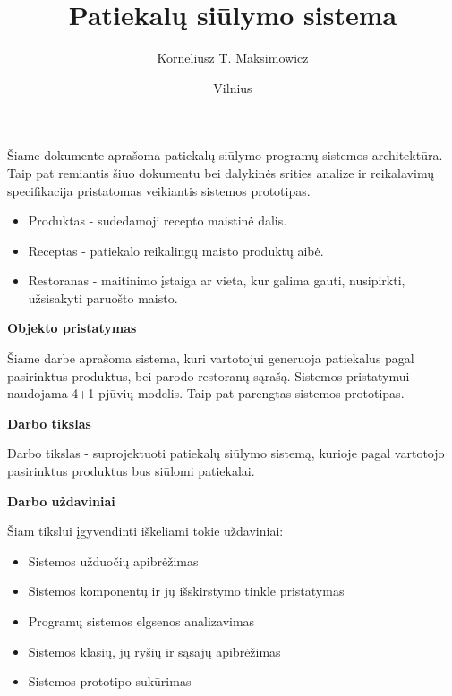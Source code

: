\documentclass{VUMIFInfKursinis}
\title{Patiekalų siūlymo sistema }
\author{Korneliusz T. Maksimowicz}
\date{Vilnius \\ \the\year}
\begin{document}
\maketitle


Šiame dokumente aprašoma patiekalų siūlymo programų sistemos architektūra.
Taip pat remiantis šiuo dokumentu bei dalykinės srities analize ir reikalavimų specifikacija
pristatomas veikiantis sistemos prototipas.

\begin{small}
\begin{itemize}[noitemsep,topsep=0pt]
\setlength\itemsep{0em}
\item {Produktas  - sudedamoji recepto maistinė dalis.}
\item {Receptas   - patiekalo reikalingų maisto produktų aibė.}
\item{Restoranas - maitinimo įstaiga ar vieta, kur galima gauti, nusipirkti, užsisakyti paruošto maisto.}
\end{itemize}

\end{small}
\tableofcontents
{}

\textbf{Objekto pristatymas}\par
Šiame darbe aprašoma sistema, kuri vartotojui generuoja patiekalus pagal pasirinktus produktus, bei parodo restoranų sąrašą. Sistemos pristatymui naudojama 4+1 pjūvių modelis. Taip pat parengtas sistemos prototipas. 
\par
\bigskip
\textbf{Darbo tikslas}\par
Darbo tikslas - suprojektuoti patiekalų siūlymo sistemą, kurioje pagal vartotojo pasirinktus produktus bus siūlomi patiekalai. \par
\bigskip
\textbf{Darbo uždaviniai}\par
Šiam tikslui įgyvendinti iškeliami tokie uždaviniai:
\begin{small}
\begin{itemize}[noitemsep,topsep=0pt]
\setlength\itemsep{0em}
\item {Sistemos užduočių apibrėžimas}
\item {Sistemos komponentų ir jų išskirstymo tinkle pristatymas}
\item{Programų sistemos elgsenos analizavimas }
\item{Sistemos klasių, jų ryšių ir sąsajų apibrėžimas }
\item {Sistemos prototipo sukūrimas}
\end{itemize}

\end{small}
\end{document}
